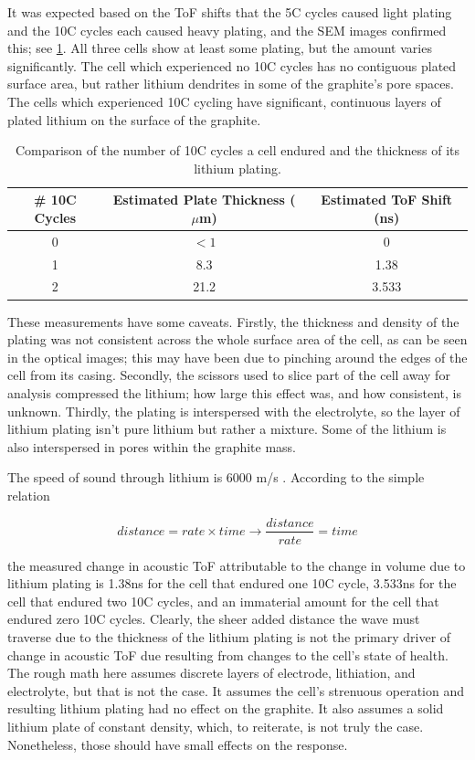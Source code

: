 It was expected based on the ToF shifts that the 5C cycles caused light plating and the 10C cycles each caused heavy plating, and the SEM images confirmed this; see \hyperref[tab:plating]{\cref{tab:plating}}. All three cells show at least some plating, but the amount varies significantly. The cell which experienced no 10C cycles has no contiguous plated surface area, but rather lithium dendrites in some of the graphite's pore spaces. The cells which experienced 10C cycling have significant, continuous layers of plated lithium on the surface of the graphite.

\begin{table}[h]
    \centering
    \begin{tabular}{c|c|c}
         \# 10C Cycles & Estimated Plate Thickness ($\mu$m) & Estimated ToF Shift (ns) \\
         \hline
         0 & $<1$ & 0 \\
         1 & 8.3 & 1.38 \\
         2 & 21.2 & 3.533 \\
    \end{tabular}
    \caption{Comparison of the number of 10C cycles a cell endured and the thickness of its lithium plating.}
    \label{tab:plating}
\end{table}

These measurements have some caveats. 
Firstly, the thickness and density of the plating was not consistent across the whole surface area of the cell, as can be seen in the optical images; this may have been due to pinching around the edges of the cell from its casing.
Secondly, the scissors used to slice part of the cell away for analysis compressed the lithium; how large this effect was, and how consistent, is unknown. 
Thirdly, the plating is interspersed with the electrolyte, so the layer of lithium plating isn't pure lithium but rather a mixture.
Some of the lithium is also interspersed in pores within the graphite mass.

The speed of sound through lithium is 6000 m/s \cite{lithium}. According to the simple relation

$$ distance = rate \times time \rightarrow \frac{distance}{rate} = time$$

the measured change in acoustic ToF attributable to the change in volume due to lithium plating is 1.38ns for the cell that endured one 10C cycle, 3.533ns for the cell that endured two 10C cycles, and an immaterial amount for the cell that endured zero 10C cycles. Clearly, the sheer added distance the wave must traverse due to the thickness of the lithium plating is not the primary driver of change in acoustic ToF due resulting from changes to the cell's state of health. The rough math here assumes discrete layers of electrode, lithiation, and electrolyte, but that is not the case.
It assumes the cell's strenuous operation and resulting lithium plating had no effect on the graphite.
It also assumes a solid lithium plate of constant density, which, to reiterate, is not truly the case. Nonetheless, those should have small effects on the response. 

